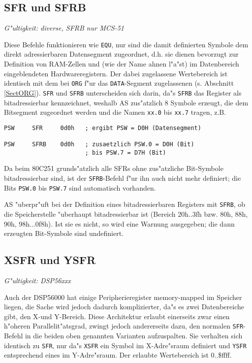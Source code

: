 \documentclass[12pt,a4paper,twoside]{report}
\makeatletter
\newcommand{\tty}[1]{{\tt #1}}
\newcommand{\ttindex}[1]{\index{#1@{\tt #1}}}
\makeatother
\begin{document}

\subsection{SFR und SFRB}
\ttindex{SFR}\ttindex{SFRB}

{\em G"ultigkeit: diverse, SFRB nur MCS-51}

Diese Befehle funktionieren wie \tty{EQU}, nur sind die damit definierten
Symbole dem direkt adressierbaren Datensegment zugeordnet, d.h. sie
dienen bevorzugt zur Definition von RAM-Zellen und (wie der Name
ahnen l"a"st) im Datenbereich eingeblendeten Hardwareregistern.  Der
dabei zugelassene Wertebereich ist identisch mit dem bei \tty{ORG} f"ur
das \tty{DATA}-Segment zugelassenen (s. Abschnitt \ref{SectORG}).
\tty{SFR} und \tty{SFRB} unterscheiden sich darin,  da"s \tty{SFRB}
das Register als bitadressierbar kennzeichnet, weshalb AS zus"atzlich 8
Symbole erzeugt, die dem Bitsegment zugeordnet werden und die Namen
\tty{xx.0} bis \tty{xx.7} tragen, z.B.
\begin{verbatim}
PSW     SFR     0d0h   ; ergibt PSW = D0H (Datensegment)

PSW     SFRB    0d0h   ; zusaetzlich PSW.0 = D0H (Bit)
                       ; bis PSW.7 = D7H (Bit)
\end{verbatim}
Da beim 80C251 grunds"atzlich alle SFRs ohne zus"atzliche Bit-Symbole
bitadressierbar sind, ist der \tty{SFRB}-Befehl f"ur ihn auch nicht mehr
definiert; die Bits \tty{PSW.0} bis \tty{PSW.7} sind automatisch vorhanden.
\par
AS "uberpr"uft bei der Definition eines bitadressierbaren Registers mit
\tty{SFRB}, ob die Speicherstelle "uberhaupt bitadressierbar ist (Bereich
20h..3fh bzw. 80h, 88h, 90h, 98h...0f8h).  Ist sie es nicht, so wird eine
Warnung ausgegeben; die dann erzeugten Bit-Symbole sind undefiniert.



\subsection{XSFR und YSFR}
\ttindex{XSFR}\ttindex{YSFR}

{\em G"ultigkeit: DSP56xxx}

Auch der DSP56000 hat einige Peripherieregister memory-mapped im
Speicher liegen, die Sache wird jedoch dadurch komplizierter, da"s
es zwei Datenbereiche gibt, den X-und Y-Bereich.  Diese Architektur
erlaubt einerseits zwar einen h"oheren Parallelit"atsgrad, zwingt
jedoch andererseits dazu, den normalen \tty{SFR}-Befehl in die beiden
oben genannten Varianten aufzuspalten.  Sie verhalten sich identisch zu
\tty{SFR}, nur da"s \tty{XSFR} ein Symbol im X-Adre"sraum definiert
und \tty{YSFR} entsprechend eines im Y-Adre"sraum.  Der erlaubte
Wertebereich ist 0..\$ffff.
\end{document}
